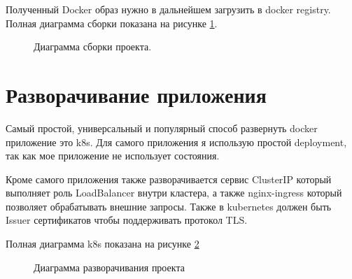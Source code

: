 \documentclass[a4paper,article,14pt]{extarticle}
\begin{document}
Полученный Docker образ нужно в дальнейшем загрузить в docker registry.
Полная диаграмма сборки показана на рисунке \ref{build}.

\begin{figure}[ht]
\begin{center}
\caption{\label{build} Диаграмма сборки проекта.}
\end {center}
\end {figure}

\section{Разворачивание приложения}

Самый простой, универсальный и популярный способ развернуть docker приложение это k8s.
Для самого приложения я использую простой deployment, так как мое приложение не использует состояния.

Кроме самого приложения также разворачивается сервис ClusterIP который выполняет роль LoadBalancer внутри кластера,
а также nginx-ingress который позволяет обрабатывать внешние запросы. 
Также в kubernetes должен быть Issuer сертификатов чтобы поддерживать протокол TLS.

Полная диаграмма k8s показана на рисунке \ref{k8s}

\begin{figure}[ht]
\begin{center}
\caption{\label{k8s} Диаграмма разворачивания проекта}
\end {center}
\end {figure}
\end{document}
